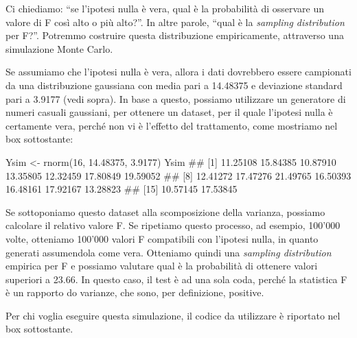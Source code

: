 \documentclass[a4paper,12pt,oneside]{book}
\newenvironment{Shaded}{\begin{snugshade}}{\end{snugshade}}
\newcommand{\DecValTok}[1]{#1}
\newcommand{\FloatTok}[1]{#1}
\newcommand{\DocumentationTok}[1]{#1}
\newcommand{\OtherTok}[1]{#1}
\newcommand{\FunctionTok}[1]{#1}
\newcommand{\NormalTok}[1]{#1}
\begin{document}
Ci chiediamo: ``se l'ipotesi nulla è vera, qual è la probabilità di osservare un valore di F così alto o più alto?''. In altre parole, ``qual è la \emph{sampling distribution} per F?''. Potremmo costruire questa distribuzione empiricamente, attraverso una simulazione Monte Carlo.

Se assumiamo che l'ipotesi nulla è vera, allora i dati dovrebbero essere campionati da una distribuzione gaussiana con media pari a 14.48375 e deviazione standard pari a 3.9177 (vedi sopra). In base a questo, possiamo utilizzare un generatore di numeri casuali gaussiani, per ottenere un dataset, per il quale l'ipotesi nulla è certamente vera, perché non vi è l'effetto del trattamento, come mostriamo nel box sottostante:

\begin{Shaded}
\begin{Highlighting}[]
\NormalTok{Ysim }\OtherTok{\textless{}{-}} \FunctionTok{rnorm}\NormalTok{(}\DecValTok{16}\NormalTok{, }\FloatTok{14.48375}\NormalTok{, }\FloatTok{3.9177}\NormalTok{)}
\NormalTok{Ysim}
\DocumentationTok{\#\#  [1] 11.25108 15.84385 10.87910 13.35805 12.32459 17.80849 19.59052}
\DocumentationTok{\#\#  [8] 12.41272 17.47276 21.49765 16.50393 16.48161 17.92167 13.28823}
\DocumentationTok{\#\# [15] 10.57145 17.53845}
\end{Highlighting}
\end{Shaded}

Se sottoponiamo questo dataset alla scomposizione della varianza, possiamo calcolare il relativo valore F. Se ripetiamo questo processo, ad esempio, 100'000 volte, otteniamo 100'000 valori F compatibili con l'ipotesi nulla, in quanto generati assumendola come vera. Otteniamo quindi una \emph{sampling distribution} empirica per F e possiamo valutare qual è la probabilità di ottenere valori superiori a 23.66. In questo caso, il test è ad una sola coda, perché la statistica F è un rapporto do varianze, che sono, per definizione, positive.

Per chi voglia eseguire questa simulazione, il codice da utilizzare è riportato nel box sottostante.
\end{document}
